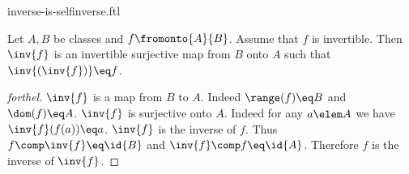 \documentclass{naproche-library}
\begin{document}
\begin{smodule}[title=The Inverse is selfinverse]{inverse-is-selfinverse.ftl}


\begin{proposition}[forthel,id=InvIsSelfinverse]
  Let $A, B$ be classes and $f \fromonto{A}{B}$.
  Assume that $f$ is invertible.
  Then $\inv{f}$ is an invertible surjective map from $B$ onto $A$ such that $\inv{(\inv{f})} \eq f$.
\end{proposition}
\begin{proof}[forthel]
  $\inv{f}$ is a map from $B$ to $A$.
  Indeed $\range(f) \eq B$ and $\dom(f) \eq A$.
  $\inv{f}$ is surjective onto $A$.
  Indeed for any $a \elem A$ we have $\inv{f}(f(a)) \eq a$.
  $\inv{f}$ is the inverse of $f$.
  Thus $f \comp \inv{f} \eq \id{B}$ and $\inv{f} \comp f \eq \id{A}$.
  Therefore $f$ is the inverse of $\inv{f}$.
\end{proof}

\end{smodule}
\end{document}

